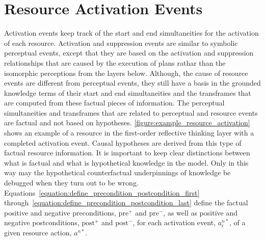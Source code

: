 \section{Resource Activation Events}

Activation events keep track of the start and end simultaneities for
the activation of each resource.  Activation and suppression events
are similar to symbolic perceptual events, except that they are based
on the activation and suppression relationships that are caused by the
execution of plans rathar than the isomorphic perceptions from the
layers below.  Although, the cause of resource events are different
from perceptual events, they still have a basis in the grounded
knowledge terms of their start and end simultaneities and the
transframes that are computed from these factual pieces of
information.  The perceptual simultaneities and transframes that are
related to perceptual and resource events are factual and not based on
hypotheses.  {\mbox{\autoref{figure:example_resource_activation}}}
shows an example of a resource in the first-order reflective thinking
layer with a completed activation event.  Causal hypotheses are
derived from this type of factual resource information.  It is
important to keep clear distinctions between what is factual and what
is hypothetical knowledge in the model.  Only in this way may the
hypothetical counterfactual underpinnings of knowledge be debugged
when they turn out to be wrong.
Equations\ \ref{equation:define_precondition_postcondition_first}
through\ \ref{equation:define_precondition_postcondition_last} define
the factual positive and negative preconditions, $\text{pre}^{+}$ and
$\text{pre}^{-}$, as well as positive and negative postconditions,
$\text{post}^{+}$ and $\text{post}^{-}$, for each activation event,
$a^{n*}_\epsilon$, of a given resource action, $a^{n*}$.
